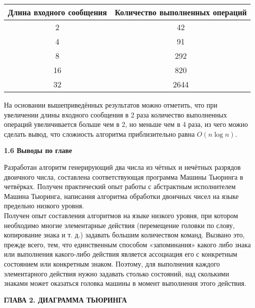 \documentclass{article}
\begin{document}
\begin{center}
\begin{tabular}{|c|c|}
    \hline
    Длина входного сообщения & Количество выполненных операций \\
    \hline
    2 & 42\\
    \hline
    4 & 91\\
    \hline
    8 & 292\\
    \hline
    16 & 820\\
    \hline
    32 & 2644\\
    \hline
\end{tabular}
\end{center}

\noindent На основании вышеприведённых результатов можно отметить, что при увеличении длины входного сообщения в 2 раза количество выполненных операций увеличивается больше чем в 2, но меньше чем в 4 раза, из чего можно сделать вывод, что сложность алгоритма приблизительно равна $O(n\log n)$.\\

\par \textbf{1.6 Выводы по главе}\\
\par Разработан алгоритм генерирующий два числа из чётных и нечётных разрядов двоичного числа, составлена соответствующая программа Машины Тьюринга в четвёрках. Получен практический опыт работы с абстрактным исполнителем Машина Тьюринга, написания алгоритма обработки двоичных чисел на языке предельно низкого уровня.\\
Получен опыт составления алгоритмов на языке низкого уровня, при котором необходимо многие элементарные действия (перемещение головки по слову, копирование знака и т. д.) задавать большим количеством команд. Вызвано это, прежде всего, тем, что единственным способом «запоминания» какого либо знака или выполнения какого-либо действия является ассоциация его с конкретным состоянием или конкретным знаком. Поэтому, для выполнения каждого элементарного действия нужно задавать столько состояний, над сколькими знаками может оказаться головка машины в момент выполнения этого действия.

\begin{center}
    \textbf{ГЛАВА 2. ДИАГРАММА ТЬЮРИНГА}\\
\end{center}
\end{document}
